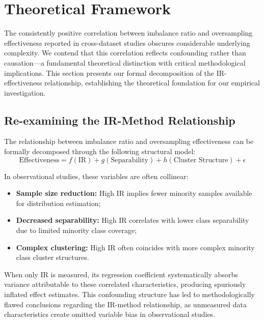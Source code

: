 \documentclass{ijSmartGrid}
\theoremstyle{definition}
\begin{document}
\section{Theoretical Framework}
\indent The consistently positive correlation between imbalance ratio and oversampling effectiveness reported in cross-dataset studies obscures considerable underlying complexity. We contend that this correlation reflects confounding rather than causation---a fundamental theoretical distinction with critical methodological implications. This section presents our formal decomposition of the IR-effectiveness relationship, establishing the theoretical foundation for our empirical investigation.

\subsection{Re-examining the IR-Method Relationship}
\indent The relationship between imbalance ratio and oversampling effectiveness can be formally decomposed through the following structural model:
\begin{equation}
\text{Effectiveness} = f(\text{IR}) + g(\text{Separability}) + h(\text{Cluster Structure}) + \epsilon
\label{eq:decomposition}
\end{equation}

In observational studies, these variables are often collinear:
\begin{itemize}
    \item \textbf{Sample size reduction:} High IR implies fewer minority samples available for distribution estimation;
    \item \textbf{Decreased separability:} High IR correlates with lower class separability due to limited minority class coverage;
    \item \textbf{Complex clustering:} High IR often coincides with more complex minority class cluster structures.
\end{itemize}

\indent When only IR is measured, its regression coefficient systematically absorbs variance attributable to these correlated characteristics, producing spuriously inflated effect estimates. This confounding structure has led to methodologically flawed conclusions regarding the IR-method relationship, as unmeasured data characteristics create omitted variable bias in observational studies.
\end{document}
